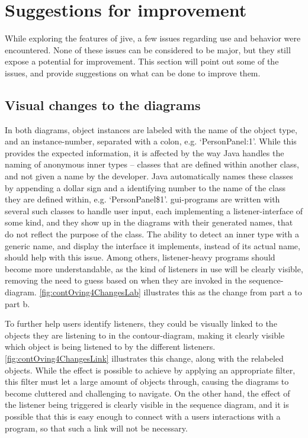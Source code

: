 \section{Suggestions for improvement}\label{jiveSuggestions}

While exploring the features of \gls{jive}, a few issues regarding use and behavior were encountered.
None of these issues can be considered to be major, but they still expose a potential for improvement.
This section will point out some of the issues, and provide suggestions on what can be done to improve them.


\subsection{Visual changes to the diagrams}\label{jiveSuggestionsVisual}
In both diagrams, object instances are labeled with the name of the object type, and an instance-number, separated with a colon, e.g. `PersonPanel:1'.
While this provides the expected information, it is affected by the way Java handles the naming of anonymous inner types -- classes that are defined within another class, and not given a name by the developer.
Java automatically names these classes by appending a dollar sign and a identifying number to the name of the class they are defined within, e.g. `PersonPanel\$1'.
\gls{gui}-programs are written with several such classes to handle user input, each implementing a listener-interface of some kind, and they show up in the diagrams with their generated names, that do not reflect the purpose of the class.
The ability to detect an inner type with a generic name, and display the interface it implements, instead of its actual name, should help with this issue.
Among others, listener-heavy programs should become more understandable, as the kind of listeners in use will be clearly visible, removing the need to guess based on when they are invoked in the sequence-diagram.
\autoref{fig:contOving4ChangesLab} illustrates this as the change from part a to part b.


To further help users identify listeners, they could be visually linked to the objects they are listening to in the contour-diagram, making it clearly visible which object is being listened to by the different listeners.
\autoref{fig:contOving4ChangesLink} illustrates this change, along with the relabeled objects.
While the effect is possible to achieve by applying an appropriate filter, this filter must let a large amount of objects through, causing the diagrams to become cluttered and challenging to navigate.
On the other hand, the effect of the listener being triggered is clearly visible in the sequence diagram, and it is possible that this is easy enough to connect with a users interactions with a program, so that such a link will not be necessary.


